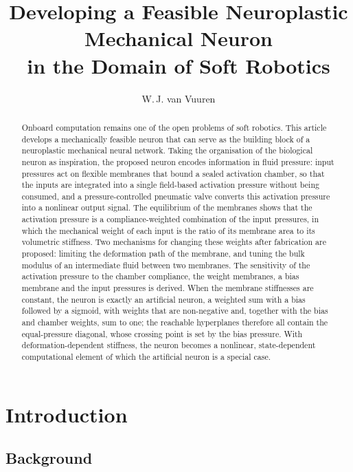 \documentclass[11pt,a4paper]{article}
\title{Developing a Feasible Neuroplastic Mechanical Neuron\\in the Domain of Soft Robotics}
\author{W.\,J. van Vuuren}  %
\date{}
\numberwithin{equation}{section}
\begin{document}
\maketitle

\begin{abstract}
Onboard computation remains one of the open problems of soft robotics. This article develops a mechanically
feasible neuron that can serve as the building block of a neuroplastic mechanical neural network. Taking the
organisation of the biological neuron as inspiration, the proposed neuron encodes information in fluid pressure:
input pressures act on flexible membranes that bound a sealed activation chamber, so that the inputs are integrated
into a single field-based activation pressure without being consumed, and a pressure-controlled pneumatic valve
converts this activation pressure into a nonlinear output signal. The equilibrium of the membranes shows that the
activation pressure is a compliance-weighted combination of the input pressures, in which the mechanical weight of
each input is the ratio of its membrane area to its volumetric stiffness. Two mechanisms for changing these weights
after fabrication are proposed: limiting the deformation path of the membrane, and tuning the bulk modulus of an
intermediate fluid between two membranes. The sensitivity of the activation pressure to the chamber compliance, the
weight membranes, a bias membrane and the input pressures is derived. When the membrane stiffnesses are constant,
the neuron is exactly an artificial neuron, a weighted sum with a bias followed by a sigmoid, with weights that are
non-negative and, together with the bias and chamber weights, sum to one; the reachable hyperplanes therefore all
contain the equal-pressure diagonal, whose crossing point is set by the bias pressure. With deformation-dependent
stiffness, the neuron becomes a nonlinear, state-dependent computational element of which the artificial neuron is
a special case.
\end{abstract}

\section{Introduction}

\subsection{Background}
\end{document}
